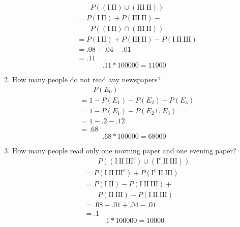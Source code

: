 \begin{enumerate}
\begin{align*}
        &\phantom{\;=\;} P((\text{I}\ \text{II})\cup(\text{III}\ \text{II}))\\
        &= P(\text{I}\ \text{II})+P(\text{III}\ \text{II})- {}\\
        &\phantom{\;=\;} P((\text{I}\ \text{II})\cap(\text{III}\ \text{II}))\\
        &= P(\text{I}\ \text{II})+P(\text{III}\ \text{II})- P(\text{I}\ \text{II}\ \text{III})\\
        &= .08 + .04 - .01\\
        &= .11
    \end{align*}
    \[ .11 * 100000 = 11000 \]
    \item How many people do not read any newspapers?
    \begin{align*}
        &\phantom{\;=\;} P(E_0)\\
        &= 1 - P(E_1) - P(E_2) - P(E_3)\\
        &= 1 - P(E_1) - P(E_2\cup E_3)\\
        &= 1 - .2 - .12\\
        &= .68
    \end{align*}
    \[ .68 * 100000 = 68000 \]
    \item How many people read only one morning paper and one evening paper?
    \begin{align*}
        &\phantom{\;=\;} P((\text{I}\ \text{II}\ \text{III}^c)\cup(\text{I}^c\ \text{II}\ \text{III}))\\
        &=
        P(\text{I}\ \text{II}\ \text{III}^c) + P(\text{I}^c\ \text{II}\ \text{III})\\
        &= P(\text{I}\ \text{II}) - P(\text{I}\ \text{II}\ \text{III}) + {}\\
        &\phantom{\;=\;} P(\text{II}\ \text{III}) - P(\text{I}\ \text{II}\ \text{III})\\
        &= .08 - .01 + .04 - .01\\
        &= .1
    \end{align*}
    \[ .1 * 100000 = 10000 \]
\end{enumerate}